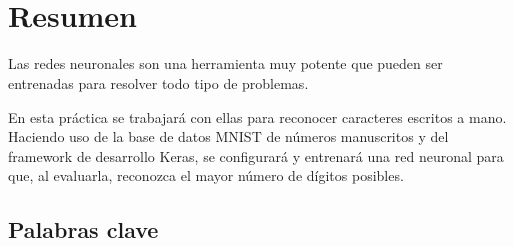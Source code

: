 \newpage

\begin{center}
  {\LARGE\bfseries\titulo}\\
\end{center}
\begin{center}
  \autor\
\end{center}

\section*{Resumen}

\bigskip

Las redes neuronales son una herramienta muy potente que pueden ser entrenadas para resolver todo tipo de problemas.

\bigskip

En esta práctica se trabajará con ellas para reconocer caracteres escritos a mano. Haciendo uso de la base de datos MNIST de números manuscritos y del framework de desarrollo Keras, se configurará y entrenará una red neuronal para que, al evaluarla, reconozca el mayor número de dígitos posibles.

\bigskip

\subsection*{Palabras clave}

\textit{\keywords}\\
